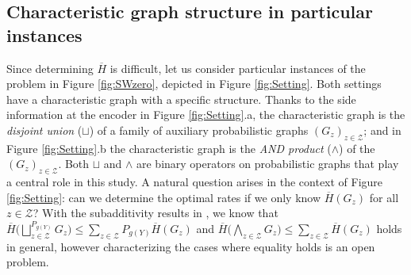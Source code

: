 \documentclass[conference,a4paper]{IEEEtran}
\def\ar#1{\textcolor{red}{\footnotesize {(ar: #1)}}}
\begin{document}
\subsection{Characteristic graph structure in particular instances}

Since determining $\overline{H}$ is difficult, let us consider particular instances of the problem in Figure \ref{fig:SWzero}, depicted in Figure \ref{fig:Setting}. Both settings have a characteristic graph with a specific structure. Thanks to the side information at the encoder in Figure \ref{fig:Setting}.a, the characteristic graph is the \emph{disjoint union} ($\sqcup$) of a family of auxiliary probabilistic graphs $(G_{z})_{z \in \mathcal{Z}}$; and in Figure \ref{fig:Setting}.b the characteristic graph is the \emph{AND product} ($\wedge$) of the $(G_{z})_{z \in \mathcal{Z}}$. Both $\sqcup$ and $\wedge$ are binary operators on probabilistic graphs that play a central role in this study. A natural question arises in the context of Figure \ref{fig:Setting}: can we determine the optimal rates if we only know $\overline{H}(G_{z})$ for all $z \in \mathcal{Z}$? With the subadditivity results in \cite[Theorem 2]{tuncel2009complementary}, we know that $\overline{H}\big(\bigsqcup_{z \in \mathcal{Z}}^{P_{g(Y)}} G_{z}\big) \leq \sum_{z \in \mathcal{Z}} P_{g(Y)} \overline{H}(G_{z})$ and $\overline{H}\big(\bigwedge_{z \in \mathcal{Z}} G_{z}\big) \leq \sum_{z \in \mathcal{Z}} \overline{H}(G_{z})$ holds in general, 
however characterizing the cases where equality holds is an open problem.%
\end{document}
